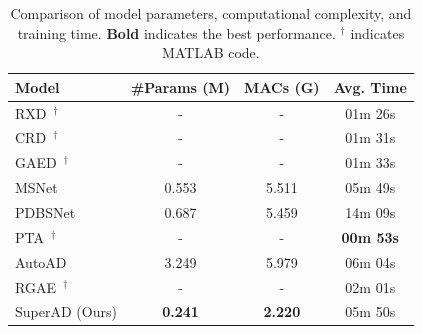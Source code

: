 \begin{table}[htbp]
  \centering
  \caption{Comparison of model parameters, computational complexity, and training time. \textbf{Bold} indicates the best performance. $^\dag$ indicates MATLAB code.}
  \begin{tabular}{lccc}
    \toprule
    Model                   & \#Params (M) & MACs (G) & Avg. Time \bigstrut \\
    \hline
    RXD~\cite{RXD}$^\dag$   & -            & -        & 01m 26s \bigstrut[t] \\
    CRD~\cite{CRD}$^\dag$   & -            & -        & 01m 31s \bigstrut[t] \\
    GAED~\cite{GAED}$^\dag$ & -            & -        & 01m 33s \bigstrut[t] \\
    MSNet~\cite{MSNet}      & 0.553        & 5.511    & 05m 49s \bigstrut[t] \\
    PDBSNet~\cite{PDBSNet}  & 0.687        & 5.459    & 14m 09s \bigstrut[t] \\
    PTA~\cite{PTA}$^\dag$   & -            & -        & \textbf{00m 53s} \bigstrut[t]    \\
    AutoAD~\cite{AutoAD}    & 3.249        & 5.979    & 06m 04s \bigstrut[t]  \\
    RGAE~\cite{RGAE}$^\dag$ & -            & -        & 02m 01s \bigstrut[t]  \\
    SuperAD (Ours)          & \textbf{0.241}        & \textbf{2.220}    & 05m 50s \bigstrut[t] \\
    \bottomrule
  \end{tabular}%
  \label{tab:cmp-efficiency}%
\end{table}%


